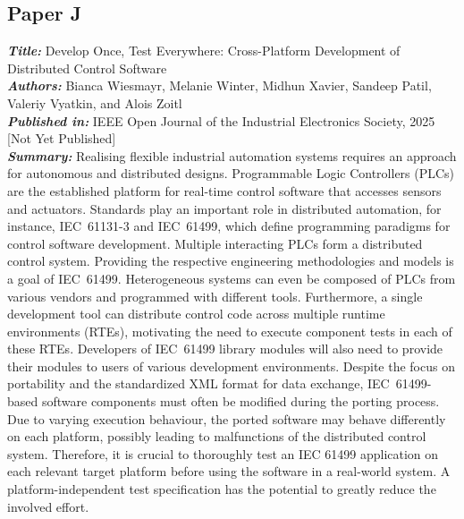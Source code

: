\subsection{Paper J}
\textbf{\textit{Title:}} Develop Once, Test Everywhere: Cross-Platform Development of Distributed Control Software\\
\textbf{\textit{Authors:}} Bianca Wiesmayr, Melanie Winter, Midhun Xavier, Sandeep Patil, Valeriy Vyatkin, and Alois Zoitl\\
\textbf{\textit{Published in:}} IEEE Open Journal of the Industrial Electronics Society, 2025 [Not Yet Published]\\
\textbf{\textit{Summary:}} Realising flexible industrial automation systems requires an approach for autonomous and distributed designs. Programmable Logic Controllers (PLCs) are the established platform for real-time control software that accesses sensors and actuators. Standards play an important role in distributed automation, for instance, IEC~61131-3 and IEC~61499, which define programming paradigms for control software development. Multiple interacting PLCs form a distributed control system. Providing the respective engineering methodologies and models is a goal of IEC~61499. Heterogeneous systems can even be composed of PLCs from various vendors and programmed with different tools. Furthermore, a single development tool can distribute control code across multiple runtime environments (RTEs), motivating the need to execute component tests in each of these RTEs. Developers of IEC~61499 library modules will also need to provide their modules to users of various development environments. Despite the focus on portability and the standardized XML format for data exchange, IEC~61499-based software components must often be modified during the porting process. Due to varying execution behaviour, the ported software may behave differently on each platform, possibly leading to malfunctions of the distributed control system. Therefore, it is crucial to thoroughly test an IEC 61499 application on each relevant target platform before using the software in a real-world system. A platform-independent test specification has the potential to greatly reduce the involved effort.\\


